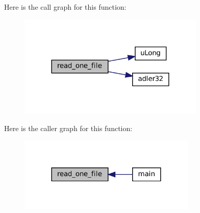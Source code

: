 Here is the call graph for this function\+:
\nopagebreak
\begin{figure}[H]
\begin{center}
\leavevmode
\includegraphics[width=252pt]{checksum-icc_8c_a331b9d633652d9d4ec772d508909a64b_cgraph}
\end{center}
\end{figure}
Here is the caller graph for this function\+:
\nopagebreak
\begin{figure}[H]
\begin{center}
\leavevmode
\includegraphics[width=240pt]{checksum-icc_8c_a331b9d633652d9d4ec772d508909a64b_icgraph}
\end{center}
\end{figure}
